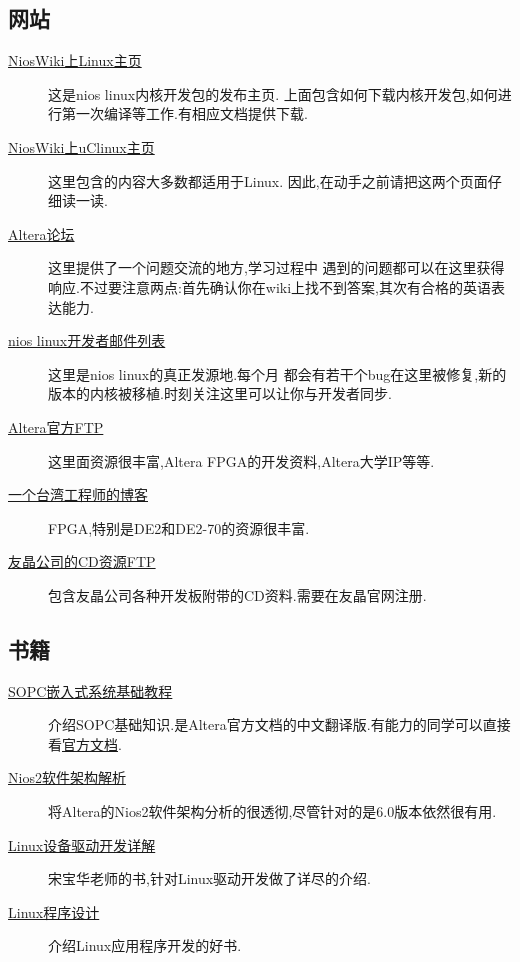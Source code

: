 \documentclass[12pt,a4paper,titlepage]{article}
\begin{document}
\subsection{网站}
\begin{description}
\item[\href{http://www.nioswiki.com/Linux}{NiosWiki上Linux主页}] 这是nios linux内核开发包的发布主页.
上面包含如何下载内核开发包,如何进行第一次编译等工作.有相应文档提供下载.
\item[\href{http://www.nioswiki.com/OperatingSystems/UClinux}{NiosWiki上uClinux主页}] 这里包含的内容大多数都适用于Linux.
因此,在动手之前请把这两个页面仔细读一读.
\item[\href{http://www.alteraforum.com/forum/forumdisplay.php?f=37}{Altera论坛}] 这里提供了一个问题交流的地方,学习过程中
遇到的问题都可以在这里获得响应.不过要注意两点:{首先确认你在wiki上找不到答案,其次有合格的英语表达能力}.
\item[\href{http://sopc.et.ntust.edu.tw/pipermail/nios2-dev/}{nios linux开发者邮件列表}] 这里是nios linux的真正发源地.每个月
都会有若干个bug在这里被修复,新的版本的内核被移植.时刻关注这里可以让你与开发者同步.
\item[\href{ftp://ftp.altera.com/up/pub/}{Altera官方FTP}] 这里面资源很丰富,Altera FPGA的开发资料,Altera大学IP等等.
\item[\href{http://www.cnblogs.com/oomusou/}{一个台湾工程师的博客}] FPGA,特别是DE2和DE2-70的资源很丰富.
\item[\href{http://www.terasic.com/downloads/cd-rom/}{友晶公司的CD资源FTP}] 包含友晶公司各种开发板附带的CD资料.需要在友晶官网注册.
\end{description}
\subsection{书籍}
\begin{description}
\item[\href{http://www.amazon.cn/mn/detailApp/ref=sr\_1\_1?\_encoding=UTF8&s=books&qid=1291516849&asin=B001EJNTCC&sr=8-1}{SOPC嵌入式系统基础教程}] 介绍SOPC基础知识.是Altera官方文档的中文翻译版.有能力的同学可以直接看\href{http://www.altera.com.cn/literature/lit-nio2.jsp}{官方文档}.
\item[\href{http://www.amazon.cn/Nios-2\%E8\%BD\%AF\%E4\%BB\%B6\%E6\%9E\%B6\%E6\%9E\%84\%E8\%A7\%A3\%E6\%9E\%90-\%E8\%94\%A1\%E4\%BC\%9F\%E7\%BA\%B2/dp/B0011Y1VXO/ref=pd\_sim\_b\_2}{Nios2软件架构解析}] 将Altera的Nios2软件架构分析的很透彻,尽管针对的是6.0版本依然很有用.
\item[\href{http://www.amazon.cn/mn/detailApp/ref=sr\_1\_1?\_encoding=UTF8&s=books&qid=1291517188&asin=B004A7L87I&sr=1-1}
{Linux设备驱动开发详解}] 宋宝华老师的书,针对Linux驱动开发做了详尽的介绍.
\item[\href{http://www.amazon.cn/mn/detailApp/ref=sr\_1\_1?\_encoding=UTF8&s=books&qid=1291517330&asin=B003Q97NPC&sr=1-1}{Linux程序设计}]
 介绍Linux应用程序开发的好书.
\end{description}
\newpage{}
\end{document}
